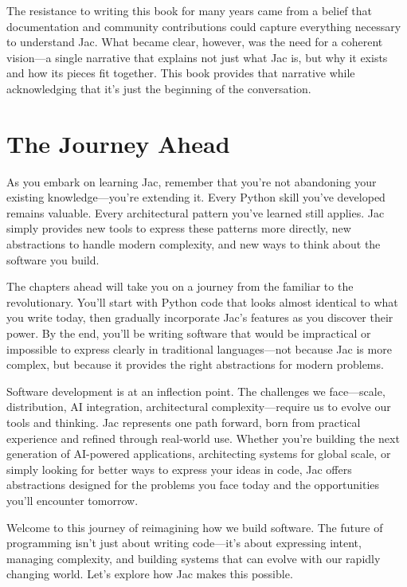 The resistance to writing this book for many years came from a belief that documentation and community contributions could capture everything necessary to understand Jac. What became clear, however, was the need for a coherent vision—a single narrative that explains not just what Jac is, but why it exists and how its pieces fit together. This book provides that narrative while acknowledging that it's just the beginning of the conversation.

\section{The Journey Ahead}

As you embark on learning Jac, remember that you're not abandoning your existing knowledge—you're extending it. Every Python skill you've developed remains valuable. Every architectural pattern you've learned still applies. Jac simply provides new tools to express these patterns more directly, new abstractions to handle modern complexity, and new ways to think about the software you build.

The chapters ahead will take you on a journey from the familiar to the revolutionary. You'll start with Python code that looks almost identical to what you write today, then gradually incorporate Jac's features as you discover their power. By the end, you'll be writing software that would be impractical or impossible to express clearly in traditional languages—not because Jac is more complex, but because it provides the right abstractions for modern problems.

Software development is at an inflection point. The challenges we face—scale, distribution, AI integration, architectural complexity—require us to evolve our tools and thinking. Jac represents one path forward, born from practical experience and refined through real-world use. Whether you're building the next generation of AI-powered applications, architecting systems for global scale, or simply looking for better ways to express your ideas in code, Jac offers abstractions designed for the problems you face today and the opportunities you'll encounter tomorrow.

Welcome to this journey of reimagining how we build software. The future of programming isn't just about writing code—it's about expressing intent, managing complexity, and building systems that can evolve with our rapidly changing world. Let's explore how Jac makes this possible.